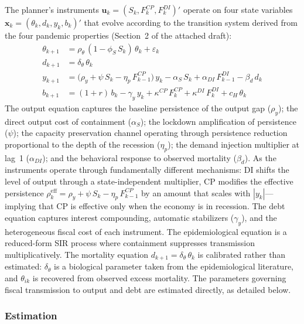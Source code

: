 \documentclass[12pt, a4paper]{article}
\begin{document}
\noindent The planner's instruments $\bm{u}_k = (S_k, F_k^{CP}, F_k^{DI})'$ operate on four state variables $\bm{x}_k = (\theta_k, d_k, y_k, b_k)'$ that evolve according to the transition system derived from the four pandemic properties (Section~2 of the attached draft):
%
\begin{align}
    \theta_{k+1} &= \rho_\theta\,(1 - \phi_S\, S_k)\, \theta_k + \varepsilon_k \\
    d_{k+1} &= \delta_\theta\, \theta_k \\
    y_{k+1} &= \bigl(\rho_y + \psi\, S_k - \eta_p\, F^{CP}_{k-1}\bigr)\, y_k - \alpha_S\, S_k + \alpha_{DI}\, F^{DI}_{k-1} - \beta_d\, d_k \\
    b_{k+1} &= (1+r)\, b_k - \gamma_y\, y_k + \kappa^{CP}\, F^{CP}_k + \kappa^{DI}\, F^{DI}_k + c_H\, \theta_k
\end{align}
%
The output equation captures the baseline persistence of the output gap ($\rho_y$); the direct output cost of containment ($\alpha_S$); the lockdown amplification of persistence ($\psi$); the capacity preservation channel operating through persistence reduction proportional to the depth of the recession ($\eta_p$); the demand injection multiplier at lag~1 ($\alpha_{DI}$); and the behavioral response to observed mortality ($\beta_d$). As the instruments operate through fundamentally different mechanisms: DI shifts the level of output through a state-independent multiplier, CP modifies the effective persistence $\rho^{\text{eff}}_k = \rho_y + \psi\, S_k - \eta_p\, F^{CP}_{k-1}$ by an amount that scales with $|y_k|$---implying that CP is effective only when the economy is in recession. The debt equation captures interest compounding, automatic stabilizers ($\gamma_y$), and the heterogeneous fiscal cost of each instrument. The epidemiological equation is a reduced-form SIR process where containment suppresses transmission multiplicatively. The mortality equation $d_{k+1} = \delta_\theta\, \theta_k$ is 
calibrated rather than estimated: $\delta_\theta$ is a biological parameter taken from the epidemiological literature, and $\theta_{ik}$ is recovered from observed excess mortality. The parameters governing fiscal transmission to output and debt are estimated directly, as detailed below.

\subsubsection{Estimation}
\end{document}
